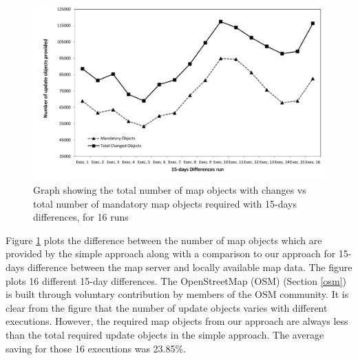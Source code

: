\begin{figure}
\centering
\includegraphics[scale=.18]{100x10016cycles.png}
\caption{Graph showing the total number of map objects with changes vs total number of mandatory map objects required with 15-days differences, for 16 runs}
\label{fg:16x15d}
\end{figure}

Figure \ref{fg:16x15d} plots the difference between the number of map objects which are provided by the simple approach along with a comparison to our approach for 15-days difference between the map server and locally available map data. The figure plots 16 different 15-day differences. The OpenStreetMap (OSM) (Section \ref{osm}) is built through voluntary contribution by members of the OSM community. It is clear from the figure that the number of update objects varies with different executions. However, the required map objects from our approach are always less than the total required update objects in the simple approach. The average saving for those 16 executions was 23.85\%. \\

